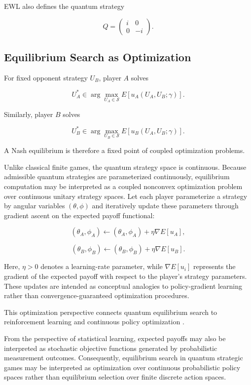 EWL also defines the quantum strategy

\begin{equation}
	Q =
	\begin{pmatrix}
		i & 0 \\
		0 & -i
	\end{pmatrix}.
\end{equation}

\subsection{Equilibrium Search as Optimization}

For fixed opponent strategy $U_B$, player $A$ solves

\begin{equation}
	U_A^*
	\in
	\arg\max_{U_A \in \mathcal{S}}
	E[u_A(U_A,U_B;\gamma)].
\end{equation}

Similarly, player $B$ solves

\begin{equation}
	U_B^*
	\in
	\arg\max_{U_B \in \mathcal{S}}
	E[u_B(U_A,U_B;\gamma)].
\end{equation}

A Nash equilibrium is therefore a fixed point of coupled optimization problems.

Unlike classical finite games, the quantum strategy space is continuous. Because admissible quantum strategies are parameterized continuously, equilibrium computation may be interpreted as a coupled nonconvex optimization problem over continuous unitary strategy spaces. Let each player parameterize a strategy by angular variables $(\theta,\phi)$ and iteratively update these parameters through gradient ascent on the expected payoff functional:

\begin{equation}
	(\theta_A,\phi_A)
	\leftarrow
	(\theta_A,\phi_A)
	+
	\eta \nabla E[u_A],
\end{equation}

\begin{equation}
	(\theta_B,\phi_B)
	\leftarrow
	(\theta_B,\phi_B)
	+
	\eta \nabla E[u_B].
\end{equation}

Here, $\eta > 0$ denotes a learning-rate parameter, while $\nabla E[u_i]$ represents the gradient of the expected payoff with respect to the player's strategy parameters. These updates are intended as conceptual analogies to policy-gradient learning rather than convergence-guaranteed optimization procedures.

This optimization perspective connects quantum equilibrium search to reinforcement learning and continuous policy optimization \cite{sutton,busoniu}.

From the perspective of statistical learning, expected payoffs may also be interpreted as stochastic objective functions generated by probabilistic measurement outcomes. Consequently, equilibrium search in quantum strategic games may be interpreted as optimization over continuous probabilistic policy spaces rather than equilibrium selection over finite discrete action spaces.